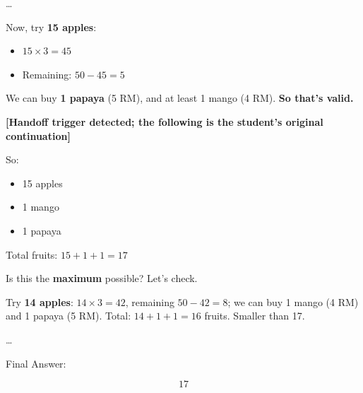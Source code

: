 \documentclass{article} %
\begin{document}
\begin{promptbox}[title={Student Trajectory (w/o Intervention)}, breakable=false]
\small
\ldots\par

Now, try \textbf{15 apples}:\par

\begin{itemize}[leftmargin=*,itemsep=0.25ex,topsep=0.5ex]
\item $15\times3=45$
\item Remaining: $50-45=5$
\end{itemize}

We can buy \textbf{1 papaya} (5 RM), and at least 1 mango (4 RM). \textbf{So that's valid.}\par

\textcolor{handoffred}{\textbf{[Handoff trigger detected; the following is the student's original continuation]}}\par

So:\par

\begin{itemize}[leftmargin=*,itemsep=0.25ex,topsep=0.5ex]
\item 15 apples
\item 1 mango
\item 1 papaya
\end{itemize}

Total fruits: $15+1+1=17$\par

Is this the \textbf{maximum} possible? Let's check.\par

Try \textbf{14 apples}: $14\times3=42$, remaining $50-42=8$; we can buy 1 mango (4 RM) and 1 papaya (5 RM). Total: $14+1+1=16$ fruits. Smaller than 17.\par

\ldots\par

Final Answer:\par

\begin{equation*}
\boxed{17}
\end{equation*}
\end{promptbox}


\end{document}
